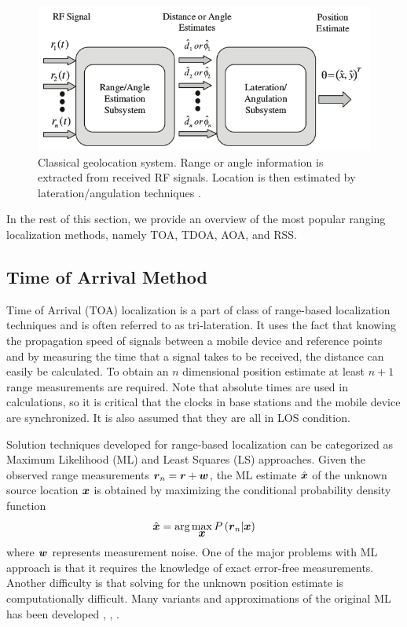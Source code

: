 \begin{figure}[h]
\centering
\includegraphics[width=1.0\textwidth]{figures/localization_example.png}
\caption{Classical geolocation system. Range or angle information is extracted from received RF signals. Location is then estimated by lateration/angulation techniques \cite{GeoLoc}.}
\label{fig:2step}
\end{figure}


In the rest of this section, we  provide an overview of the most popular ranging localization methods, namely  TOA, TDOA, AOA, and RSS.



\subsection{Time of Arrival Method}

Time of Arrival (TOA) localization is a part of class of range-based localization techniques and is often referred to as tri-lateration. It uses the fact that knowing the propagation speed of  signals between a mobile device and reference points and by measuring the time that a signal takes to be received, the distance can easily be calculated. To obtain an $n$  dimensional position estimate at least $n+1$ range measurements are required. Note that absolute times are used in calculations, so it is critical that the  clocks in base stations and the mobile device are synchronized. It is also assumed that they are all in LOS condition. %

Solution techniques developed for range-based localization can be categorized as Maximum Likelihood (ML) and Least Squares (LS) approaches. 
Given the observed range measurements $\mbox{\boldmath$r$}_n = \mbox{\boldmath$r$} + \mbox{\boldmath$w$}$, the ML estimate $\hat{\mbox{\boldmath$x$}}$ of the unknown source location $\mbox{\boldmath$x$}$ is obtained by maximizing the conditional probability density function 
\begin{equation}
\nonumber
\hat{\mbox{\boldmath$x$}} = \mbox{arg}\max_{\mbox{\boldmath$x$}} P\left(\mbox{\boldmath$r$}_n|\mbox{\boldmath$x$}\right)
\end{equation}
where $\mbox{\boldmath$w$}$ represents measurement noise. One of the major problems with ML approach is that it requires the knowledge of exact error-free measurements. Another difficulty is that solving for the unknown position estimate is computationally difficult. Many variants and approximations of the original ML has been  developed \cite{HoML}, \cite{Guvenc2}, \cite{Guvenc}.

